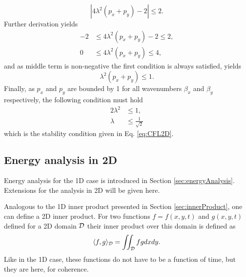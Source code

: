 \begin{equation*}
    \left|4\lambda^2(p_x + p_y)-2\right| \leq 2.
\end{equation*}
Further derivation yields
\begin{align*}
    -2 &\leq 4\lambda^2(p_x + p_y)-2 \leq 2, \\
    0 &\leq 4\lambda^2(p_x + p_y) \leq 4,
\end{align*} 
and as middle term is non-negative the first condition is always satisfied, yields
\begin{equation*}
    \lambda^2(p_x + p_y) \leq 1.
\end{equation*}
Finally, as $p_x$ and $p_y$ are bounded by 1 for all wavenumbers $\beta_x$ and $\beta_y$ respectively, the following condition must hold
\begin{align}
    2\lambda^2&\leq 1,\nonumber\\
    \lambda &\leq \frac{1}{\sqrt{2}}
\end{align}
which is the stability condition given in Eq. \eqref{eq:CFL2D}.

\subsection{Energy analysis in 2D}\label{sec:energyAnalysis2DWave}
\def\domXred{\underline{d_x}}
\def\domYred{\underline{d_y}}
\def\domXredBoth{\underline{\overline{d_x}}}
\def\domYredBoth{\underline{\overline{d_y}}}
\def\domRedBoth{\underline{\overline{d}}}

Energy analysis for the 1D case is introduced in Section \ref{sec:energyAnalysis}. Extensions for the analysis in 2D will be given here.

Analogous to the 1D inner product presented in Section \ref{sec:innerProduct}, one can define a 2D inner product. For two functions $f = f(x,y,t)$ and $g(x,y,t)$ defined for a 2D domain $\mathcal{D}$ their inner product over this domain is defined as
\begin{equation}
    \langle f, g \rangle_{\mathcal{D}}  = \iint_{\mathcal{D}} f g dx dy.
\end{equation}
Like in the 1D case, these functions do not have to be a function of time, but they are here, for coherence. 

